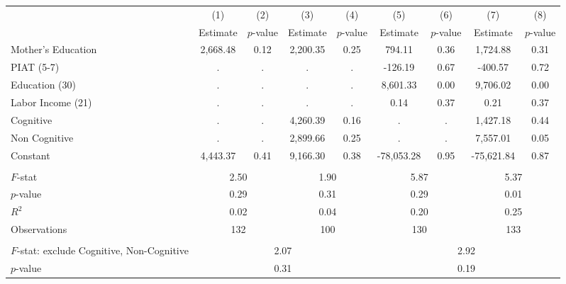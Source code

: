 \begin{tabular}{lcccccccc} \toprule
 & (1) & (2) & (3) & (4) & (5) & (6) & (7) & (8) \\
 & Estimate & $p$-value & Estimate & $p$-value  & Estimate & $p$-value  & Estimate & $p$-value  \\ \midrule 
Mother's Education &     2,668.48 &         0.12 &     2,200.35 &         0.25 &       794.11 &         0.36 &     1,724.88 &         0.31 \\  
PIAT (5-7) &            . &            . &            . &            . &      -126.19 &         0.67 &      -400.57 &         0.72 \\  
Education (30) &            . &            . &            . &            . &     8,601.33 &         0.00 &     9,706.02 &         0.00 \\  
Labor Income (21) &            . &            . &            . &            . &         0.14 &         0.37 &         0.21 &         0.37 \\  
Cognitive &            . &            . &     4,260.39 &         0.16 &            . &            . &     1,427.18 &         0.44 \\  
Non Cognitive &            . &            . &     2,899.66 &         0.25 &            . &            . &     7,557.01 &         0.05 \\  
Constant &     4,443.37 &         0.41 &     9,166.30 &         0.38 &   -78,053.28 &         0.95 &   -75,621.84 &         0.87 \\  \\ \midrule
$F$-stat &         \multicolumn{2}{c}{2.50} &          \multicolumn{2}{c}{1.90} &             \multicolumn{2}{c}{5.87} &                 \multicolumn{2}{c}{5.37}  \\  
$p$-value &         \multicolumn{2}{c}{0.29} &          \multicolumn{2}{c}{0.31} &             \multicolumn{2}{c}{0.29} &                 \multicolumn{2}{c}{0.01}  \\  
$R^2$ &         \multicolumn{2}{c}{0.02} &          \multicolumn{2}{c}{0.04} &             \multicolumn{2}{c}{0.20} &                 \multicolumn{2}{c}{0.25}  \\  
Observations &        \multicolumn{2}{c}{132} &        \multicolumn{2}{c}{100} &     \multicolumn{2}{c}{130} &         \multicolumn{2}{c}{133}  \\  \\ \midrule
$F$-stat: exclude Cognitive, Non-Cognitive  &             \multicolumn{4}{c}{2.07} &               \multicolumn{4}{c}{2.92}  \\  
$p$-value &                \multicolumn{4}{c}{0.31} &               \multicolumn{4}{c}{0.19}   \\  \bottomrule \end{tabular}